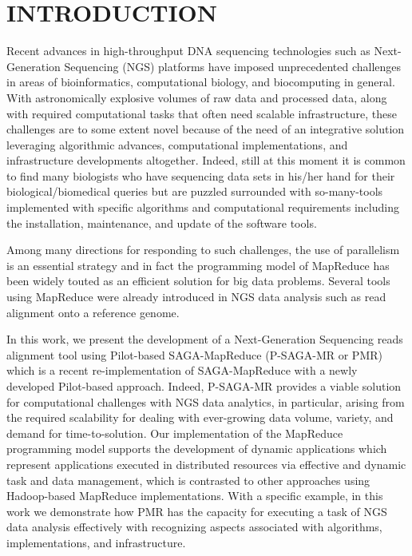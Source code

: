 \documentclass{sig-alternate}
\begin{document}
\section{INTRODUCTION} 
Recent advances in high-throughput DNA sequencing technologies such as Next-Generation Sequencing (NGS) platforms have  imposed unprecedented challenges in areas of bioinformatics, computational biology, and biocomputing in general\cite{metzker2010,1000genome,wang2009-natrevgen,alex2009,mcpherson2009}.  With astronomically explosive volumes of raw data and processed data, along with required computational tasks that often need scalable infrastructure, these challenges are to some extent novel because of the need of an integrative solution leveraging algorithmic advances, computational implementations, and infrastructure developments altogether. Indeed, still at this moment it is common to find many biologists who have sequencing data sets in his/her hand for their biological/biomedical queries but are puzzled surrounded with so-many-tools implemented with specific algorithms and computational requirements including the installation, maintenance, and update of the software tools. 

Among many directions for responding to such challenges, the use of parallelism is an essential strategy and in fact the programming model of MapReduce has been widely touted as an efficient solution for big data problems\cite{mapreduce-2004-dean}.  Several tools using MapReduce were already introduced in NGS data analysis such as read alignment onto a reference genome\cite{cloudburst, gatk,langmead2009,seal2011,langmead2010, taylor2010}.

In this work, we present the development of a Next-Generation Sequencing reads alignment tool using Pilot-based SAGA-MapReduce (P-SAGA-MR or PMR) which is a recent re-implementation of SAGA-MapReduce with a newly developed Pilot-based approach\cite{Sehgal2011590,pmr2012}.  Indeed, P-SAGA-MR provides a viable solution for computational challenges with NGS data analytics, in particular, arising from the required scalability for dealing with ever-growing data volume, variety, and demand for time-to-solution.  Our implementation of the MapReduce programming model supports the development of dynamic applications which represent applications executed in distributed resources via effective and dynamic task and data management, which is contrasted to other approaches using Hadoop-based MapReduce implementations\cite{cloudburst,langmead2009,seal2011,langmead2010}.  With a specific example, in this work we demonstrate how PMR has the capacity for executing a task of NGS data analysis effectively with recognizing aspects associated with algorithms, implementations, and infrastructure.
\end{document}
